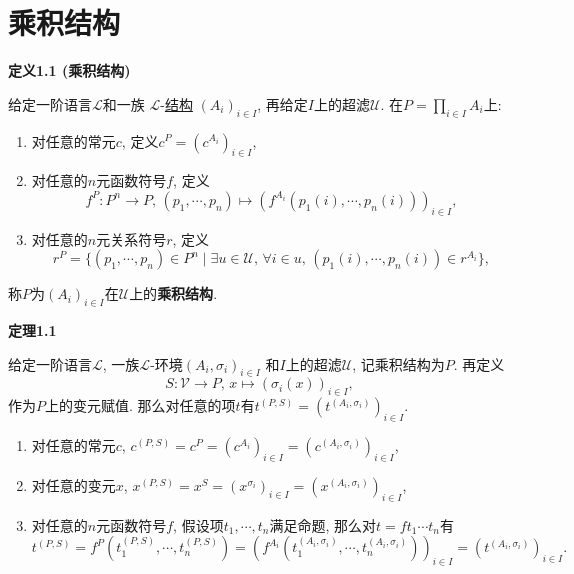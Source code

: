 \documentclass[UTF8]{ctexart}
\begin{document}
\setlength{\abovedisplayskip}{1pt}
\setlength{\belowdisplayskip}{1pt}

\section{乘积结构}

\hypertarget{sec:定义1.1}{}
\noindent\textbf{定义1.1 (乘积结构)}

给定一阶语言$\mathcal{L}$和一族
$\mathcal{L}$-\href{../01 一阶语言的结构/01 一阶语言的结构#nameddest=sec:定义1.1}
{结构} $(A_i)_{i\in I}$, 再给定$I$上的超滤$\mathcal{U}$.
在$\displaystyle P=\prod_{i\in I}A_i$上:
\begin{enumerate}
    \item 对任意的常元$c$, 定义$c^P=(c^{A_i})_{i\in I}$,
    \item 对任意的$n$元函数符号$f$, 定义
    \[
        f^P:P^n\to P,\,
        (p_1,\cdots,p_n)\mapsto(f^{A_i}(p_1(i),\cdots,p_n(i)))_{i\in I},
    \]
    \item 对任意的$n$元关系符号$r$, 定义
    \[
        r^P=\{(p_1,\cdots,p_n)\in P^n\mid\exists u\in\mathcal{U},\,
        \forall i\in u,\,(p_1(i),\cdots,p_n(i))\in r^{A_i}\},
    \]
\end{enumerate}
称$P$为$(A_i)_{i\in I}$在$\mathcal{U}$上的\textbf{乘积结构}.

\vspace{10pt}

\hypertarget{sec:定理1.1}{}
\noindent\textbf{定理1.1}

给定一阶语言$\mathcal{L}$, 一族$\mathcal{L}$-环境$(A_i,\sigma_i)_{i\in I}$
和$I$上的超滤$\mathcal{U}$, 记乘积结构为$P$. 再定义
\[
    S:\mathcal{V}\to P,\,x\mapsto(\sigma_i(x))_{i\in I},
\]
作为$P$上的变元赋值. 那么对任意的项$t$有$t^{(P,S)}=(t^{(A_i,\sigma_i)})_{i\in I}$.


\begin{enumerate}
    \item 对任意的常元$c$,
    $c^{(P,S)}=c^P=(c^{A_i})_{i\in I}=(c^{(A_i,\sigma_i)})_{i\in I}$,
    \item 对任意的变元$x$,
    $x^{(P,S)}=x^S=(x^{\sigma_i})_{i\in I}=(x^{(A_i,\sigma_i)})_{i\in I}$,
    \item 对任意的$n$元函数符号$f$, 假设项$t_1,\cdots,t_n$满足命题,
    那么对$t=ft_1\cdots t_n$有
    \begin{equation*}
        t^{(P,S)}=f^P(t_1^{(P,S)},\cdots,t_n^{(P,S)})
        =(f^{A_i}(t_1^{(A_i,\sigma_i)},\cdots,t_n^{(A_i,\sigma_i)}))_{i\in I}
        =(t^{(A_i,\sigma_i)})_{i\in I}.
    \tag*{\qedsymbol}\end{equation*}
\end{enumerate}
\end{document}
